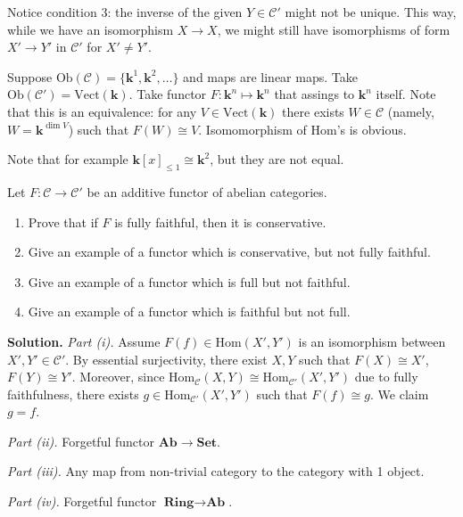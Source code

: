 \documentclass{category-template}
\begin{document}
Notice condition $3$: the inverse of the given $Y \in \mathcal{C}'$ might not be
unique. This way, while we have an isomorphism $X \to X$, we might still have
isomorphisms of form $X' \to Y'$ in $\mathcal{C}'$ for $X' \neq Y'$.

Suppose $\text{Ob}(\mathcal{C}) = \{\mathbf{k}^1, \mathbf{k}^2, \dots\}$ and
maps are linear maps. Take $\text{Ob}(\mathcal{C}')=\text{Vect}(\mathbf{k})$.
Take functor $F: \mathbf{k}^n \mapsto \mathbf{k}^n$ that assings to
$\mathbf{k}^n$ itself. Note that this is an equivalence: for any $V \in
\text{Vect}(\mathbf{k})$ there exists $W \in \mathcal{C}$ (namely,
$W=\mathbf{k}^{\dim V}$) such that $F(W) \cong V$. Isomomorphism of Hom's is
obvious.

Note that for example $\mathbf{k}[x]_{\leq 1} \cong \mathbf{k}^2$, but they are
not equal. 

\begin{problem}
    Let $F: \mathcal{C} \to \mathcal{C}'$ be an additive functor of abelian 
    categories.
    \begin{enumerate}
        \item[(i)] Prove that if $F$ is fully faithful, then it is conservative.
        \item[(ii)] Give an example of a functor which is conservative, but not 
        fully faithful.
        \item[(iii)] Give an example of a functor which is full but not faithful.
        \item[(iv)] Give an example of a functor which is faithful but not full.  
    \end{enumerate}
\end{problem}

\textbf{Solution.} \textit{Part (i).} Assume $F(f) \in \text{Hom}(X',Y')$ is an
isomorphism between $X',Y' \in \mathcal{C}'$. By essential surjectivity, there
exist $X,Y$ such that $F(X) \cong X'$, $F(Y) \cong Y'$. Moreover, since
$\text{Hom}_{\mathcal{C}}(X,Y) \cong \text{Hom}_{\mathcal{C}'}(X',Y')$ due to
fully faithfulness, there exists $g \in \text{Hom}_{\mathcal{C}'}(X',Y')$ such
that $F(f) \cong g$. We claim $g=f$.

\textit{Part (ii).} Forgetful functor $\mathbf{Ab} \to \mathbf{Set}$.

\textit{Part (iii).} Any map from non-trivial category to the category with 1 object.

\textit{Part (iv).} Forgetful functor $\textbf{Ring} \to \textbf{Ab}$.
\end{document}
